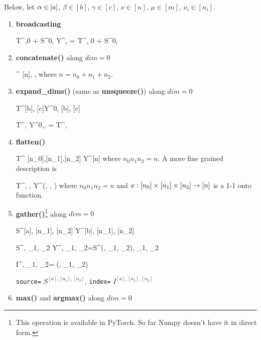 Below, let $\alpha\in[a]$, $\beta\in[b]$, $\gamma\in[c]$,
$\nu\in[n]$,
$\mu\in[m]$,
$\nu_i\in[n_i]$.


\begin{enumerate}
\item {\bf broadcasting}

\beq
T^{\alpha,0} + S^{0,\beta}
\rarrow Y^{\alp, \beta}=
T^{\alpha, 0} + S^{0,\beta}
\eeq

\item {\bf concatenate()} along $dim=0$

\rarrow
{}^{
[n], \beta, \gamma}
\eeq
where $n= n_0 + n_1 + n_2$.

\item {\bf expand\_dims()} (same as {\bf unsqueeze()}) along $dim=0$

\beq
T^{[b], [c]}\rarrow Y^{0, [b], [c]}
\eeq

\beq
T^{\beta, \gamma}
\rarrow 
Y^{0,\beta, \gamma} =  T^{\beta, \gamma}
\eeq

\item {\bf flatten()}

\beq
T^{
{[n_0]},{[n_1]},{[n_2]}}\rarrow
Y^{[n]}
\eeq
where $n_0n_1n_2=n$.
A more fine grained description is

\beq
T^{
{\alpha, \beta, \gamma}}\rarrow
Y^{\nu(\alpha, \beta, \gamma)}
\eeq
where
$n_0 n_1 n_2=n$ and
$\nu:[n_0]\times[n_1]\times[n_2]\rightarrow [n]$
is a 1-1 onto function.


\item {\bf gather()}\footnote{This operation is available in
PyTorch. So far Numpy doesn't have it in direct form.} along $dim=0$


\beq
S^{[a], [n_1], [n_2]}
\rarrow Y^{[b], [n_1], [n_2]}
\eeq

\beq
S^{\alp, \nu_1, \nu_2}
\rarrow
Y^{\beta, \nu_1, \nu_2}=S^{\beta(\alp, \nu_1, \nu_2),
\nu_1, \nu_2}
\eeq

\beq
I^{\alp, \nu_1, \nu_2}=
\beta(\alp, \nu_1, \nu_2)
\eeq

{\tt source=} $S^{[a], [n_1], [n_2]}$, 
{\tt index=} $I^{[a], [n_1], [n_2]}$

\item {\bf max()} and {\bf argmax()} along $dim=0$


\end{enumerate}
